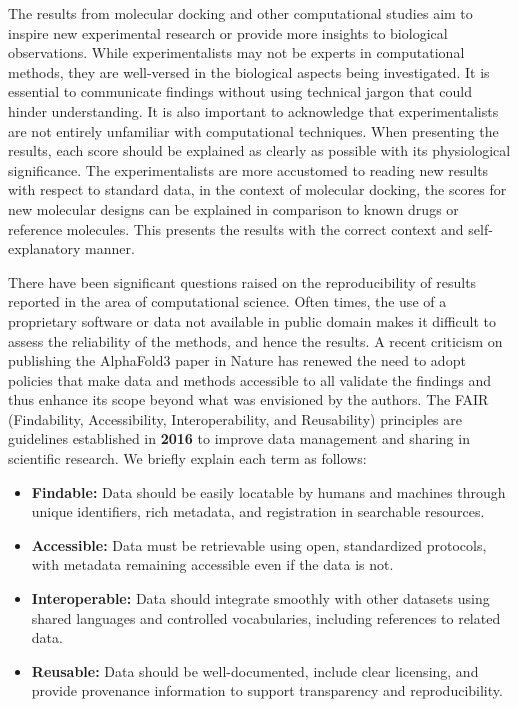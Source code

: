 \documentclass[10pt, a4paper]{book}
\begin{document}

The results from molecular docking and other computational studies aim to inspire new experimental research or provide more insights to biological observations. While experimentalists may not be experts in computational methods, they are well-versed in the biological aspects being investigated. It is essential to communicate findings without using technical jargon that could hinder understanding. It is also important to acknowledge that experimentalists are not entirely unfamiliar with computational techniques. When presenting the results, each score should be explained as clearly as possible with its physiological significance. The experimentalists are more accustomed to reading new results with respect to standard data, in the context of molecular docking, the scores for new molecular designs can be explained in comparison to known drugs or reference molecules. This presents the results with the correct context and self-explanatory manner. 
    

There have been significant questions raised on the reproducibility of results reported in the area of computational science\cite{bib58, bib59}. Often times, the use of a proprietary software or data not available in public domain makes it difficult to assess the reliability of the methods, and hence the results. A recent criticism on publishing the AlphaFold3 paper in Nature\cite{bib57} has renewed the need to adopt policies that make data and methods accessible to all validate the findings and thus enhance its scope beyond what was envisioned by the authors. The FAIR (Findability, Accessibility, Interoperability, and Reusability) principles are guidelines established in \textbf{2016} to improve data management and sharing in scientific research\cite{bib60}. 
We briefly explain each term as follows: 
\begin{itemize}
    \item \textbf{Findable:} Data should be easily locatable by humans and machines through unique identifiers, rich metadata, and registration in searchable resources.
    \item \textbf{Accessible:} Data must be retrievable using open, standardized protocols, with metadata remaining accessible even if the data is not.
    \item \textbf{Interoperable:} Data should integrate smoothly with other datasets using shared languages and controlled vocabularies, including references to related data.
    \item \textbf{Reusable:} Data should be well-documented, include clear licensing, and provide provenance information to support transparency and reproducibility.
\end{itemize}
\end{document}

